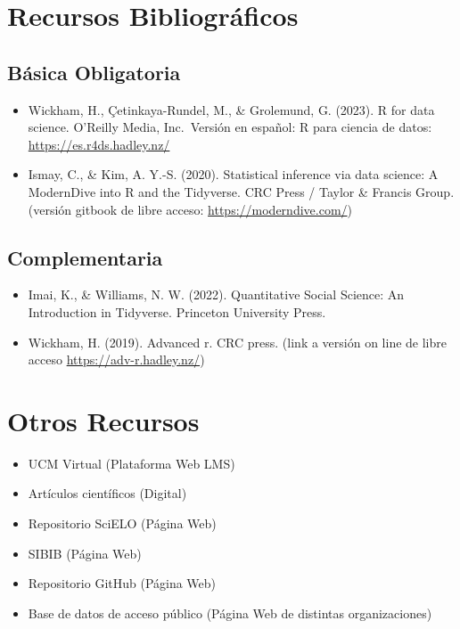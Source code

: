 \documentclass[11pt,letter,]{article}
\providecommand{\tightlist}{%
  \setlength{\itemsep}{0pt}\setlength{\parskip}{0pt}}
\begin{document}
\hypertarget{recursos-bibliogruxe1ficos}{%
\section{Recursos Bibliográficos}\label{recursos-bibliogruxe1ficos}}

\hypertarget{buxe1sica-obligatoria}{%
\subsection{Básica Obligatoria}\label{buxe1sica-obligatoria}}

\begin{itemize}
\tightlist
\item
  Wickham, H., Çetinkaya-Rundel, M., \& Grolemund, G. (2023). R for data
  science. O'Reilly Media, Inc.~Versión en español: R para ciencia de
  datos: \url{https://es.r4ds.hadley.nz/}
\item
  Ismay, C., \& Kim, A. Y.-S. (2020). Statistical inference via data
  science: A ModernDive into R and the Tidyverse. CRC Press / Taylor \&
  Francis Group. (versión gitbook de libre acceso:
  \url{https://moderndive.com/})
\end{itemize}

\hypertarget{complementaria}{%
\subsection{Complementaria}\label{complementaria}}

\begin{itemize}
\tightlist
\item
  Imai, K., \& Williams, N. W. (2022). Quantitative Social Science: An
  Introduction in Tidyverse. Princeton University Press.
\item
  Wickham, H. (2019). Advanced r. CRC press. (link a versión on line de
  libre acceso \url{https://adv-r.hadley.nz/})
\end{itemize}

\hypertarget{otros-recursos}{%
\section{Otros Recursos}\label{otros-recursos}}

\begin{itemize}
\tightlist
\item
  UCM Virtual (Plataforma Web LMS)
\item
  Artículos científicos (Digital)
\item
  Repositorio SciELO (Página Web)
\item
  SIBIB (Página Web)
\item
  Repositorio GitHub (Página Web)
\item
  Base de datos de acceso público (Página Web de distintas
  organizaciones)
\end{itemize}
\end{document}
